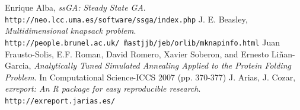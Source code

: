 \documentclass{article}[12pt]
\begin{document}
	\begin{thebibliography}{9}
		 Enrique Alba, \textit{ssGA: Steady State GA}. \texttt{http://neo.lcc.uma.es/software/ssga/index.php}
		 J. E. Beasley, \textit{Multidimensional knapsack problem}. \texttt{http://people.brunel.ac.uk/\~ \ mastjjb/jeb/orlib/mknapinfo.html}
		 Juan Frausto-Solis, E.F. Roman, David Romero, Xavier Soberon, and Ernesto Liñan-Garcia, \textit{Analytically Tuned Simulated Annealing Applied to the Protein Folding Problem}. In Computational Science-ICCS 2007 (pp. 370-377)
		 J. Arias, J. Cozar, \textit{exreport: An R package for easy reproducible research}. \texttt{http://exreport.jarias.es/}
	\end{thebibliography}
	
\end{document}
